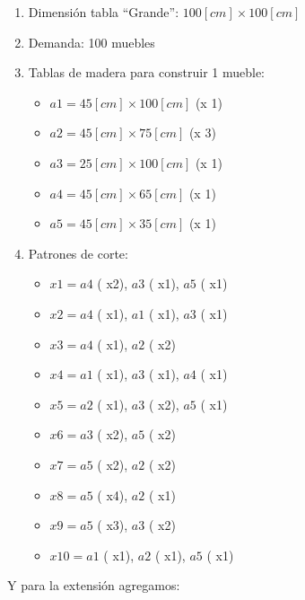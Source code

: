 \documentclass[journal, 10pt]{IEEEtran}
\begin{document}
		\begin{enumerate}
			\item
				Dimensión tabla ``Grande'': $100[cm] \times 100[cm]$
		
			\item	
				Demanda: 100 muebles
		
			\item
				Tablas de madera para construir 1 mueble:
				
				\begin{itemize}
				\item $a1 = 45[cm] \times 100[cm]$ (x 1)
				\item $a2 = 45[cm] \times 75[cm]$ (x 3)
				\item $a3 = 25[cm] \times 100[cm]$ (x 1)
				\item $a4 = 45[cm] \times 65[cm]$  (x 1)
				\item $a5 = 45[cm] \times 35[cm]$ (x 1)
				\end{itemize}
			
			\item	
				Patrones de corte:
		
				\begin{itemize}
					\item
						$x1 = a4$ ( x2), $a3$ ( x1), $a5$ ( x1)
					\item
						$x2 = a4$ ( x1), $a1$ ( x1), $a3$ ( x1)
					\item
						$x3 = a4$ ( x1), $a2$ ( x2)   
					\item
						$x4 = a1$ ( x1), $a3$ ( x1), $a4$ ( x1)  
					\item
						$x5 = a2$ ( x1), $a3$ ( x2), $a5$ ( x1)
					\item
						$x6 = a3$ ( x2), $a5$ ( x2)   
					\item
						$x7 = a5$ ( x2), $a2$ ( x2)  
					\item
						$x8 = a5$ ( x4), $a2$ ( x1) 
					\item
						$x9 = a5$ ( x3), $a3$ ( x2)
					\item
						$x10 = a1$ ( x1), $a2$ ( x1), $a5$ ( x1) 
				\end{itemize}
		\end{enumerate}
			Y para la extensión agregamos:
\end{document}
